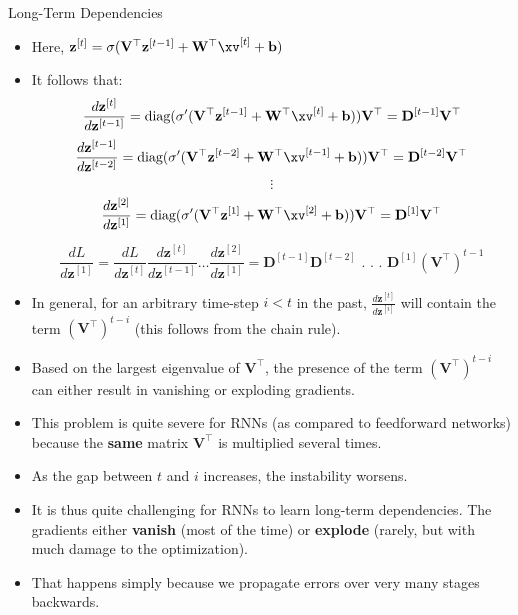 \begin{vbframe}{Long-Term Dependencies}
  
  \begin{itemize}
    \item Here, $\mathbf{z}^{[t]} = \sigma(\mathbf{V}^\top \mathbf{z}^{[t-1]} + \mathbf{W}^\top \xv^{[t]} + \mathbf{b})$
    \item It follows that:
    $$ \frac{d \mathbf{z}^{[t]}}{d\mathbf{z}^{[t-1]}} = \text{diag}(\sigma' (\mathbf{V}^\top \mathbf{z}^{[t-1]} + \mathbf{W}^\top \xv^{[t]} + \mathbf{b})) \mathbf{V}^\top = \mathbf{D}^{[t-1]} \mathbf{V}^\top $$
    $$ \frac{d \mathbf{z}^{[t-1]}}{d\mathbf{z}^{[t-2]}} = \text{diag}(\sigma' (\mathbf{V}^\top \mathbf{z}^{[t-2]} + \mathbf{W}^\top \xv^{[t-1]} + \mathbf{b})) \mathbf{V}^\top= \mathbf{D}^{[t-2]} \mathbf{V}^\top $$
    $$ \vdots $$
    $$ \frac{d \mathbf{z}^{[2]}}{d\mathbf{z}^{[1]}} = \text{diag}(\sigma' (\mathbf{V}^\top \mathbf{z}^{[1]} + \mathbf{W}^\top \xv^{[2]} + \mathbf{b})) \mathbf{V}^\top = \mathbf{D}^{[1]} \mathbf{V}^\top $$
    
    $$ \frac{d L}{d \mathbf{z}^{[1]}} = \frac{d L}{d \mathbf{z}^{[t]}} \frac{d \mathbf{z}^{[t]}}{d \mathbf{z}^{[t-1]}} \dots \frac{d \mathbf{z}^{[2]}}{d \mathbf{z}^{[1]}} = \mathbf{D}^{[t-1]} \mathbf{D}^{[t-2]}   \text{ . . . } \mathbf{D}^{[1]} (\mathbf{V}^\top)^{t-1}$$
    \item In general, for an arbitrary time-step $i<t$ in the past, $\frac{d\mathbf{z}^{[t]}}{d\mathbf{z}^{[i]}}$ will contain the term $(\mathbf{V}^\top)^{t-i}$ (this follows from the chain rule).
    \item Based on the largest eigenvalue of $\mathbf{V}^\top$, the presence of the term $(\mathbf{V}^\top)^{t-i}$ can either result in vanishing or exploding gradients.
    \item This problem is quite severe for RNNs (as compared to feedforward networks) because the \textbf{same} matrix $\mathbf{V}^\top$ is multiplied several times. \href{https://tinyurl.com/vangrad}{}
    \item As the gap between $t$ and $i$ increases, the instability worsens.
    \item It is thus quite challenging for RNNs to learn long-term dependencies. The gradients either \textbf{vanish} (most of the time) or \textbf{explode} (rarely, but with much damage to the optimization).
    \item That happens simply because we propagate errors over very many stages backwards.
  \end{itemize}
  

\end{vbframe}
